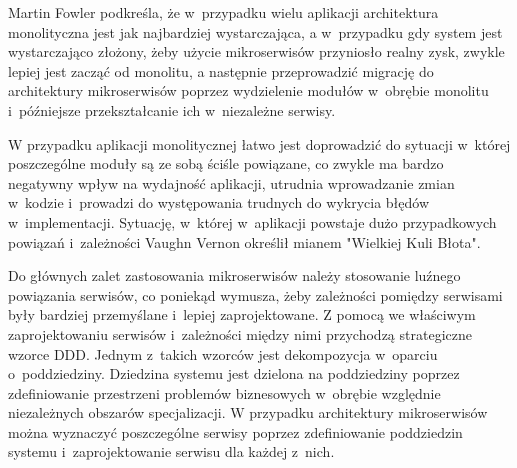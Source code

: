 \par
Martin Fowler podkreśla, że w~przypadku wielu aplikacji architektura monolityczna jest jak najbardziej wystarczająca,
a w~przypadku gdy system jest wystarczająco złożony, żeby użycie mikroserwisów przyniosło realny zysk, zwykle lepiej jest zacząć od monolitu,
a następnie przeprowadzić migrację do architektury mikroserwisów poprzez wydzielenie modułów w~obrębie monolitu
i~późniejsze przekształcanie ich w~niezależne serwisy\cite{url:monolith-first}.

\par
W przypadku aplikacji monolitycznej łatwo jest doprowadzić do sytuacji w~której poszczególne moduły są ze sobą ściśle powiązane,
co zwykle ma bardzo negatywny wpływ na wydajność aplikacji, utrudnia wprowadzanie zmian w~kodzie i~prowadzi do występowania trudnych do wykrycia błędów w~implementacji.
Sytuację, w~której w~aplikacji powstaje dużo przypadkowych powiązań i~zależności Vaughn Vernon określił mianem "Wielkiej Kuli Błota"\cite{book:ddd-kompendium}.

\par
Do głównych zalet zastosowania mikroserwisów należy stosowanie luźnego powiązania serwisów,
co poniekąd wymusza, żeby zależności pomiędzy serwisami były bardziej przemyślane i~lepiej zaprojektowane.
Z pomocą we właściwym zaprojektowaniu serwisów i~zależności między nimi przychodzą strategiczne wzorce DDD.
Jednym z~takich wzorców jest dekompozycja w~oparciu o~poddziedziny\cite{book:ddd-evans}.
Dziedzina systemu jest dzielona na poddziedziny poprzez zdefiniowanie przestrzeni problemów biznesowych w~obrębie względnie niezależnych obszarów specjalizacji.
W przypadku architektury mikroserwisów można wyznaczyć poszczególne serwisy poprzez zdefiniowanie poddziedzin systemu
i~zaprojektowanie serwisu dla każdej z~nich\cite{book:microservices-patterns}.

\thispagestyle{normal}
